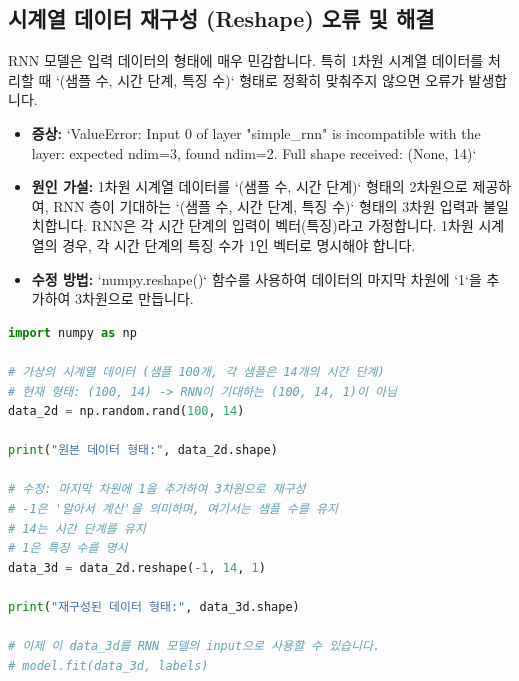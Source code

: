 \documentclass[11pt,a4paper]{article}
\begin{document}
\subsection{시계열 데이터 재구성 (Reshape) 오류 및 해결}
RNN 모델은 입력 데이터의 형태에 매우 민감합니다. 특히 1차원 시계열 데이터를 처리할 때 `(샘플 수, 시간 단계, 특징 수)` 형태로 정확히 맞춰주지 않으면 오류가 발생합니다.

\begin{itemize}
    \item \textbf{증상:} `ValueError: Input 0 of layer "simple_rnn" is incompatible with the layer: expected ndim=3, found ndim=2. Full shape received: (None, 14)`
    \item \textbf{원인 가설:} 1차원 시계열 데이터를 `(샘플 수, 시간 단계)` 형태의 2차원으로 제공하여, RNN 층이 기대하는 `(샘플 수, 시간 단계, 특징 수)` 형태의 3차원 입력과 불일치합니다. RNN은 각 시간 단계의 입력이 벡터(특징)라고 가정합니다. 1차원 시계열의 경우, 각 시간 단계의 특징 수가 1인 벡터로 명시해야 합니다.
    \item \textbf{수정 방법:} `numpy.reshape()` 함수를 사용하여 데이터의 마지막 차원에 `1`을 추가하여 3차원으로 만듭니다.
\end{itemize}

\begin{lstlisting}[language=Python, caption=시계열 데이터 재구성 예시, label=lst:reshape_fix]
import numpy as np

# 가상의 시계열 데이터 (샘플 100개, 각 샘플은 14개의 시간 단계)
# 현재 형태: (100, 14) -> RNN이 기대하는 (100, 14, 1)이 아님
data_2d = np.random.rand(100, 14) 

print("원본 데이터 형태:", data_2d.shape)

# 수정: 마지막 차원에 1을 추가하여 3차원으로 재구성
# -1은 '알아서 계산'을 의미하며, 여기서는 샘플 수를 유지
# 14는 시간 단계를 유지
# 1은 특징 수를 명시
data_3d = data_2d.reshape(-1, 14, 1) 

print("재구성된 데이터 형태:", data_3d.shape)

# 이제 이 data_3d를 RNN 모델의 input으로 사용할 수 있습니다.
# model.fit(data_3d, labels)
\end{lstlisting}

\begin{table}[h!]
\centering
\caption{시계열 데이터 재구성 전/후 비교}
\label{tab:reshape_comparison}
\end{table}
\end{document}
